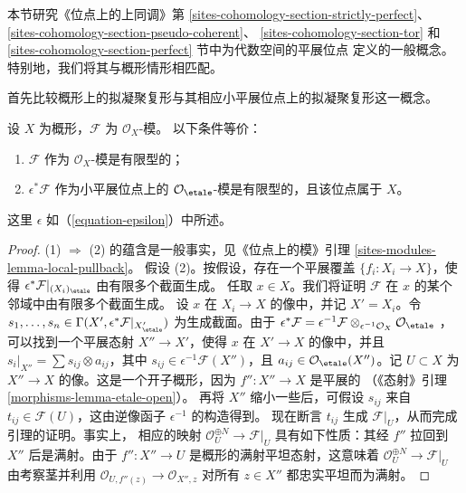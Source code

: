 \noindent
本节研究《位点上的上同调》第
\ref{sites-cohomology-section-strictly-perfect}、
\ref{sites-cohomology-section-pseudo-coherent}、
\ref{sites-cohomology-section-tor} 和
\ref{sites-cohomology-section-perfect} 节中为代数空间的平展位点
定义的一般概念。特别地，我们将其与概形情形相匹配。

\medskip\noindent
首先比较概形上的拟凝聚复形与其相应小平展位点上的拟凝聚复形这一概念。

\begin{lemma}
\label{lemma-descend-finite-type}
设 $X$ 为概形，$\mathcal{F}$ 为 $\mathcal{O}_X$-模。
以下条件等价：
\begin{enumerate}
\item $\mathcal{F}$ 作为 $\mathcal{O}_X$-模是有限型的；
\item $\epsilon^*\mathcal{F}$ 作为小平展位点上的
$\mathcal{O}_\etale$-模是有限型的，且该位点属于 $X$。
\end{enumerate}
这里 $\epsilon$ 如（\ref{equation-epsilon}）中所述。
\end{lemma}

\begin{proof}
(1) $\Rightarrow$ (2) 的蕴含是一般事实，见《位点上的模》引理
\ref{sites-modules-lemma-local-pullback}。
假设 (2)。按假设，存在一个平展覆盖
$\{f_i : X_i \to X\}$，使得
$\epsilon^*\mathcal{F}|_{(X_i)_\etale}$ 由有限多个截面生成。
任取 $x \in X$。我们将证明 $\mathcal{F}$
在 $x$ 的某个邻域中由有限多个截面生成。
设 $x$ 在 $X_i \to X$ 的像中，并记 $X' = X_i$。令
$s_1, \ldots, s_n \in
\Gamma(X', \epsilon^*\mathcal{F}|_{X'_\etale})$
为生成截面。由于
$\epsilon^*\mathcal{F} =
\epsilon^{-1}\mathcal{F} \otimes_{\epsilon^{-1}\mathcal{O}_X}
\mathcal{O}_\etale$
，可以找到一个平展态射 $X'' \to X'$，使得 $x$
在 $X' \to X$ 的像中，并且
$s_i|_{X''} = \sum s_{ij} \otimes a_{ij}$，其中
$s_{ij} \in \epsilon^{-1}\mathcal{F}(X'')$，且
$a_{ij} \in \mathcal{O}_\etale(X'')$。记 $U \subset X$ 为
$X'' \to X$ 的像。这是一个开子概形，因为 $f'' : X'' \to X$ 是平展的
（《态射》引理 \ref{morphisms-lemma-etale-open}）。 %
再将 $X''$ 缩小一些后，可假设 $s_{ij}$ 来自
$t_{ij} \in \mathcal{F}(U)$，这由逆像函子 $\epsilon^{-1}$ 的构造得到。
现在断言 $t_{ij}$ 生成 $\mathcal{F}|_U$，从而完成引理的证明。事实上，
相应的映射
$\mathcal{O}_U^{\oplus N} \to \mathcal{F}|_U$
具有如下性质：其经 $f''$ 拉回到 $X''$ 后是满射。由于
$f'' : X'' \to U$ 是概形的满射平坦态射，这意味着
$\mathcal{O}_U^{\oplus N} \to \mathcal{F}|_U$ 由考察茎并利用
$\mathcal{O}_{U, f''(z)} \to \mathcal{O}_{X'', z}$
对所有 $z \in X''$ 都忠实平坦而为满射。
\end{proof}

